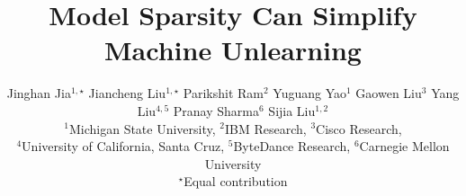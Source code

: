 \documentclass{article}
\title{
Model Sparsity Can Simplify Machine Unlearning
}
\author{%
  Jinghan Jia$^{1, \star}$
  \And Jiancheng Liu$^{1, \star}$
  \And Parikshit Ram$^{2}$ 
  \And Yuguang Yao$^{1}$
  \And Gaowen Liu$^{3}$
  \And Yang Liu$^{4,5}$
  \And Pranay Sharma$^{6}$
  \And Sijia Liu$^{1,2}$   
  \AND \vspace*{-5mm}\\
  ${}^1$Michigan State University,
  ${}^2$IBM Research,
  ${}^3$Cisco Research,\\
  ${}^4$University of California, Santa Cruz,
   ${}^5$ByteDance Research,
  ${}^6$Carnegie Mellon University\\
  $^\star$Equal contribution\\
}
\begin{document}
\maketitle

% 











{{
%


}}
\newpage
\clearpage
\appendix

\end{document}
